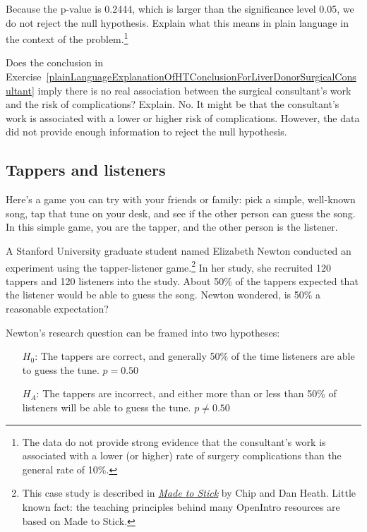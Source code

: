 \begin{exercise} \label{plainLanguageExplanationOfHTConclusionForLiverDonorSurgicalConsultant}
Because the p-value is 0.2444, which is larger than the significance level 0.05, we do not reject the null hypothesis. Explain what this means in plain language in the context of the problem.\footnote{The data do not provide strong evidence that the consultant's work is associated with a lower (or higher) rate of surgery complications than the general rate of 10\%.}
\end{exercise}

\begin{example}{Does the conclusion in Exercise~\ref{plainLanguageExplanationOfHTConclusionForLiverDonorSurgicalConsultant} imply there is no real association between the surgical consultant's work and the risk of complications? Explain.}
No. It might be that the consultant's work is associated with a lower or higher risk of complications. However, the data did not provide enough information to reject the null hypothesis. %
\end{example}


\subsection{Tappers and listeners}

Here's a game you can try with your friends or family: pick a simple, well-known song, tap that tune on your desk, and see if the other person can guess the song. In this simple game, you are the tapper, and the other person is the listener.

A Stanford University graduate student named Elizabeth Newton conducted an experiment using the tapper-listener game.\footnote{This case study is described in \emph{\href{http://www.openintro.org/redirect.php?go=made-to-stick&redirect=textbook_pdf_preliminary}{Made to Stick}} by Chip and Dan Heath. Little known fact: the teaching principles behind many OpenIntro resources are based on Made to Stick.} In her study, she recruited 120 tappers and 120 listeners into the study. About 50\% of the tappers expected that the listener would be able to guess the song. Newton wondered, is 50\% a reasonable expectation?

Newton's research question can be framed into two hypotheses:
\begin{itemize}
\setlength{\itemsep}{0mm}
\item[$H_0$:] The tappers are correct, and generally 50\% of the time listeners are able to guess the tune. $p = 0.50$
\item[$H_A$:] The tappers are incorrect, and either more than or less than 50\% of listeners will be able to guess the tune. $p \neq 0.50$
\end{itemize}

